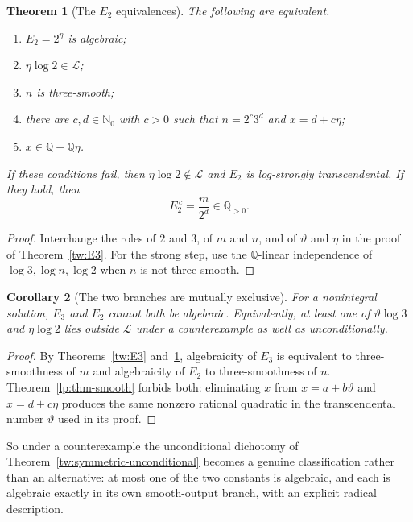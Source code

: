 \documentclass[11pt,oneside]{article}
\newtheorem{theorem}{Theorem}[section]
\newtheorem{corollary}[theorem]{Corollary}
\theoremstyle{definition}
\theoremstyle{remark}
\newcommand{\Nzero}{\mathbb N_0}
\newcommand{\Q}{\mathbb Q}
\newcommand{\thetaq}{\vartheta}
\newcommand{\LL}{\mathcal L}
\begin{document}
\begin{theorem}[The $E_2$ equivalences]
\label{tw:E2}
The following are equivalent.
\begin{enumerate}[label=\textup{(\roman*)}]
\item $E_2=2^{\eta}$ is algebraic;
\item $\eta\log2\in\LL$;
\item $n$ is three-smooth;
\item there are $c,d\in\Nzero$ with $c>0$ such that $n=2^c3^d$ and $x=d+c\eta$;
\item $x\in\Q+\Q\eta$.
\end{enumerate}
If these conditions fail, then $\eta\log2\notin\LL$ and $E_2$ is log-strongly transcendental.
If they hold, then
\begin{equation}
 E_2^{\,c}=\frac{m}{2^d}\in\Q_{>0}.
 \label{tw:eq-E2-radical}
\end{equation}
\end{theorem}

\begin{proof}
Interchange the roles of $2$ and $3$, of $m$ and $n$, and of $\thetaq$ and $\eta$ in the proof
of Theorem~\ref{tw:E3}.  For the strong step, use the $\Q$-linear independence of
$\log3,\log n,\log2$ when $n$ is not three-smooth.
\end{proof}

\begin{corollary}[The two branches are mutually exclusive]
\label{tw:not-both-algebraic}
For a nonintegral solution, $E_3$ and $E_2$ cannot both be algebraic.  Equivalently, at least
one of $\thetaq\log3$ and $\eta\log2$ lies outside $\LL$ under a counterexample as well as
unconditionally.
\end{corollary}

\begin{proof}
By Theorems~\ref{tw:E3} and~\ref{tw:E2}, algebraicity of $E_3$ is equivalent to
three-smoothness of $m$ and algebraicity of $E_2$ to three-smoothness of $n$.
Theorem~\ref{lp:thm-smooth} forbids both: eliminating $x$ from
$x=a+b\thetaq$ and $x=d+c\eta$ produces the same nonzero rational quadratic in the
transcendental number $\thetaq$ used in its proof.
\end{proof}

So under a counterexample the unconditional dichotomy of
Theorem~\ref{tw:symmetric-unconditional} becomes a genuine classification rather than an
alternative: at most one of the two constants is algebraic, and each is algebraic exactly in
its own smooth-output branch, with an explicit radical description.
\end{document}
